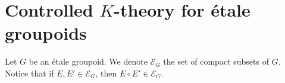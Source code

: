 \section{Controlled $K$-theory for étale groupoids}

Let $G$ be an étale groupoid. We denote $\mathcal E_G$ the set of compact subsets of $G$. Notice that if $E,E'\in \mathcal E_G$, then $E \circ E'\in\mathcal E_G$. 

